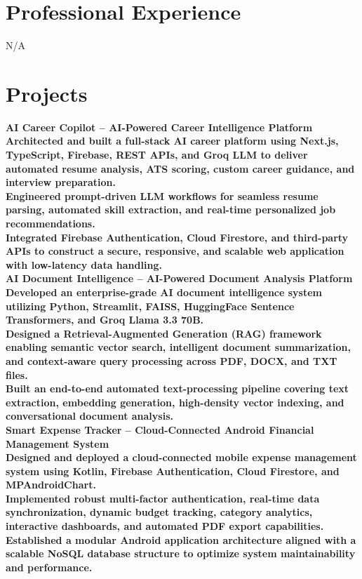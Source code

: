 \documentclass[10pt]{article}
\begin{document}
\section*{Professional Experience}

N/A

\section*{Projects}

\textbf{AI Career Copilot – AI-Powered Career Intelligence Platform}\\[4pt]
\textbf{Architected and built a full-stack AI career platform using Next.js, TypeScript, Firebase, REST APIs, and Groq LLM to deliver automated resume analysis, ATS scoring, custom career guidance, and interview preparation.}\\[4pt]
\textbf{Engineered prompt-driven LLM workflows for seamless resume parsing, automated skill extraction, and real-time personalized job recommendations.}\\[4pt]
\textbf{Integrated Firebase Authentication, Cloud Firestore, and third-party APIs to construct a secure, responsive, and scalable web application with low-latency data handling.}\\[4pt]
\textbf{AI Document Intelligence – AI-Powered Document Analysis Platform}\\[4pt]
\textbf{Developed an enterprise-grade AI document intelligence system utilizing Python, Streamlit, FAISS, HuggingFace Sentence Transformers, and Groq Llama 3.3 70B.}\\[4pt]
\textbf{Designed a Retrieval-Augmented Generation (RAG) framework enabling semantic vector search, intelligent document summarization, and context-aware query processing across PDF, DOCX, and TXT files.}\\[4pt]
\textbf{Built an end-to-end automated text-processing pipeline covering text extraction, embedding generation, high-density vector indexing, and conversational document analysis.}\\[4pt]
\textbf{Smart Expense Tracker – Cloud-Connected Android Financial Management System}\\[4pt]
\textbf{Designed and deployed a cloud-connected mobile expense management system using Kotlin, Firebase Authentication, Cloud Firestore, and MPAndroidChart.}\\[4pt]
\textbf{Implemented robust multi-factor authentication, real-time data synchronization, dynamic budget tracking, category analytics, interactive dashboards, and automated PDF export capabilities.}\\[4pt]
\textbf{Established a modular Android application architecture aligned with a scalable NoSQL database structure to optimize system maintainability and performance.}\\[4pt]
\end{document}
